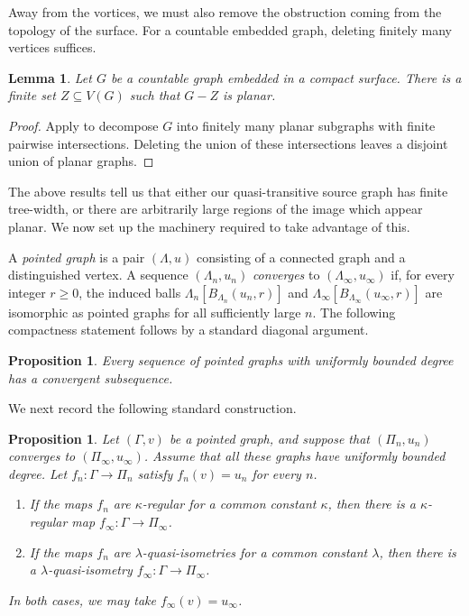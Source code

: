 \documentclass[10pt,a4paper]{amsart}
\newtheorem{proposition}[theorem]{Proposition}
\newtheorem{lemma}[theorem]{Lemma}
\theoremstyle{definition}
\begin{document}
Away from the vortices, we must also remove the obstruction coming from the topology of the surface.
For a countable embedded graph, deleting finitely many vertices suffices.

\begin{lemma}\label{lem:finite-planarising-set}
Let $G$ be a countable graph embedded in a compact surface.
There is a finite set $Z\subseteq V(G)$ such that $G-Z$ is planar.
\end{lemma}

\begin{proof}
Apply \cite[Thm.~1.2]{georgakopoulos2025excluded} to decompose $G$ into finitely many planar subgraphs with finite pairwise intersections.
Deleting the union of these intersections leaves a disjoint union of planar graphs.
\end{proof}


The above results tell us that either our quasi-transitive source graph has finite tree-width, or there are arbitrarily large regions of the image which appear planar. We now  set up the machinery required to take advantage of this. 

A \emph{pointed graph} is a pair $(\Lambda,u)$ consisting of a connected graph and a distinguished vertex.
A sequence $(\Lambda_n,u_n)$ \emph{converges} to $(\Lambda_\infty,u_\infty)$ if, for every integer $r\geq0$, the induced balls $\Lambda_n[B_{\Lambda_n}(u_n,r)]$ and $\Lambda_\infty[B_{\Lambda_\infty}(u_\infty,r)]$ are isomorphic as pointed graphs for all sufficiently large $n$.
The following compactness statement follows by a standard diagonal argument. 

\begin{proposition}\label{prop:pointed-compactness}
Every sequence of pointed graphs with uniformly bounded degree has a convergent subsequence. 
\end{proposition}



We next record the following standard construction.

\begin{proposition}\label{prop:pointed-limits-maps}
Let $(\Gamma,v)$ be a pointed graph, and suppose that $(\Pi_n,u_n)$ converges to $(\Pi_\infty,u_\infty)$. Assume that all these graphs have uniformly bounded degree. Let $f_n:\Gamma\to\Pi_n$ satisfy $f_n(v)=u_n$ for every $n$.
\begin{enumerate}
\item If the maps $f_n$ are $\kappa$-regular for a common constant $\kappa$, then there is a $\kappa$-regular map $f_\infty:\Gamma\to\Pi_\infty$.
\item If the maps $f_n$ are $\lambda$-quasi-isometries for a common constant $\lambda$, then there is a $\lambda$-quasi-isometry $f_\infty:\Gamma\to\Pi_\infty$.
\end{enumerate}
In both cases, we may take $f_\infty(v)=u_\infty$.
\end{proposition}
\end{document}
